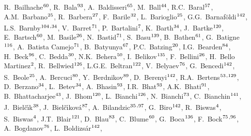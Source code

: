 \begin{flushleft}
R.~Bailhache$^\textrm{\scriptsize 60}$,
R.~Bala$^\textrm{\scriptsize 93}$,
A.~Baldisseri$^\textrm{\scriptsize 65}$,
M.~Ball$^\textrm{\scriptsize 44}$,
R.C.~Baral$^\textrm{\scriptsize 57}$,
A.M.~Barbano$^\textrm{\scriptsize 25}$,
R.~Barbera$^\textrm{\scriptsize 27}$,
F.~Barile$^\textrm{\scriptsize 32}$,
L.~Barioglio$^\textrm{\scriptsize 25}$,
G.G.~Barnaf\"{o}ldi$^\textrm{\scriptsize 142}$,
L.S.~Barnby$^\textrm{\scriptsize 104}$\textsuperscript{,}$^\textrm{\scriptsize 34}$,
V.~Barret$^\textrm{\scriptsize 71}$,
P.~Bartalini$^\textrm{\scriptsize 7}$,
K.~Barth$^\textrm{\scriptsize 34}$,
J.~Bartke$^\textrm{\scriptsize 120}$,
E.~Bartsch$^\textrm{\scriptsize 60}$,
M.~Basile$^\textrm{\scriptsize 26}$,
N.~Bastid$^\textrm{\scriptsize 71}$,
S.~Basu$^\textrm{\scriptsize 139}$,
B.~Bathen$^\textrm{\scriptsize 61}$,
G.~Batigne$^\textrm{\scriptsize 116}$,
A.~Batista Camejo$^\textrm{\scriptsize 71}$,
B.~Batyunya$^\textrm{\scriptsize 67}$,
P.C.~Batzing$^\textrm{\scriptsize 20}$,
I.G.~Bearden$^\textrm{\scriptsize 84}$,
H.~Beck$^\textrm{\scriptsize 96}$,
C.~Bedda$^\textrm{\scriptsize 30}$,
N.K.~Behera$^\textrm{\scriptsize 50}$,
I.~Belikov$^\textrm{\scriptsize 135}$,
F.~Bellini$^\textrm{\scriptsize 26}$,
H.~Bello Martinez$^\textrm{\scriptsize 2}$,
R.~Bellwied$^\textrm{\scriptsize 126}$,
L.G.E.~Beltran$^\textrm{\scriptsize 122}$,
V.~Belyaev$^\textrm{\scriptsize 76}$,
G.~Bencedi$^\textrm{\scriptsize 142}$,
S.~Beole$^\textrm{\scriptsize 25}$,
A.~Bercuci$^\textrm{\scriptsize 80}$,
Y.~Berdnikov$^\textrm{\scriptsize 89}$,
D.~Berenyi$^\textrm{\scriptsize 142}$,
R.A.~Bertens$^\textrm{\scriptsize 53}$\textsuperscript{,}$^\textrm{\scriptsize 129}$,
D.~Berzano$^\textrm{\scriptsize 34}$,
L.~Betev$^\textrm{\scriptsize 34}$,
A.~Bhasin$^\textrm{\scriptsize 93}$,
I.R.~Bhat$^\textrm{\scriptsize 93}$,
A.K.~Bhati$^\textrm{\scriptsize 91}$,
B.~Bhattacharjee$^\textrm{\scriptsize 43}$,
J.~Bhom$^\textrm{\scriptsize 120}$,
L.~Bianchi$^\textrm{\scriptsize 126}$,
N.~Bianchi$^\textrm{\scriptsize 73}$,
C.~Bianchin$^\textrm{\scriptsize 141}$,
J.~Biel\v{c}\'{\i}k$^\textrm{\scriptsize 38}$,
J.~Biel\v{c}\'{\i}kov\'{a}$^\textrm{\scriptsize 87}$,
A.~Bilandzic$^\textrm{\scriptsize 35}$\textsuperscript{,}$^\textrm{\scriptsize 97}$,
G.~Biro$^\textrm{\scriptsize 142}$,
R.~Biswas$^\textrm{\scriptsize 4}$,
S.~Biswas$^\textrm{\scriptsize 4}$,
J.T.~Blair$^\textrm{\scriptsize 121}$,
D.~Blau$^\textrm{\scriptsize 83}$,
C.~Blume$^\textrm{\scriptsize 60}$,
G.~Boca$^\textrm{\scriptsize 136}$,
F.~Bock$^\textrm{\scriptsize 75}$\textsuperscript{,}$^\textrm{\scriptsize 96}$,
A.~Bogdanov$^\textrm{\scriptsize 76}$,
L.~Boldizs\'{a}r$^\textrm{\scriptsize 142}$,

\end{flushleft}
